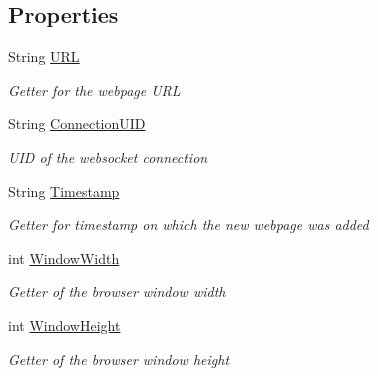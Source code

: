 \subsection*{Properties}
\begin{DoxyCompactItemize}
\item 
String \hyperlink{class_web_analyzer_1_1_events_1_1_add_webpage_event_a81c2419e44f174687def7a813525fe00}{U\+R\+L}
\begin{DoxyCompactList}\small\item\em Getter for the webpage U\+R\+L \end{DoxyCompactList}\item 
String \hyperlink{class_web_analyzer_1_1_events_1_1_add_webpage_event_a9afa88861712d1088b56b2080cf54b1a}{Connection\+U\+I\+D}
\begin{DoxyCompactList}\small\item\em U\+I\+D of the websocket connection \end{DoxyCompactList}\item 
String \hyperlink{class_web_analyzer_1_1_events_1_1_add_webpage_event_a4d534a36b31fcd6ee317a7d214b31ba7}{Timestamp}
\begin{DoxyCompactList}\small\item\em Getter for timestamp on which the new webpage was added \end{DoxyCompactList}\item 
int \hyperlink{class_web_analyzer_1_1_events_1_1_add_webpage_event_a3674f3dd2d4bcb2e5ff10af97b4f8bbb}{Window\+Width}
\begin{DoxyCompactList}\small\item\em Getter of the browser window width \end{DoxyCompactList}\item 
int \hyperlink{class_web_analyzer_1_1_events_1_1_add_webpage_event_a77f8941177623cdfc87011eaf979c538}{Window\+Height}
\begin{DoxyCompactList}\small\item\em Getter of the browser window height \end{DoxyCompactList}\end{DoxyCompactItemize}
